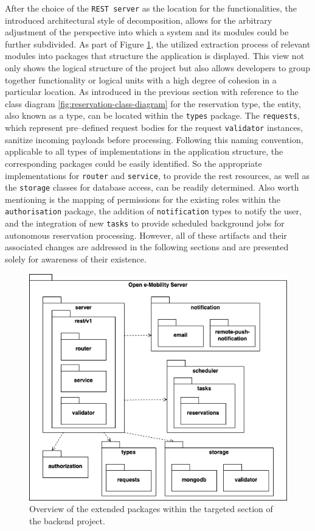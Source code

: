 After the choice of the \texttt{REST server} as the location for the functionalities, the introduced architectural style of decomposition, allows for the arbitrary adjustment of the perspective into which a system and its modules could be further subdivided.
As part of Figure \ref{fig:package-view}, the utilized extraction process of relevant modules into packages that structure the application is displayed. This view not only shows the logical structure of the project but also allows developers to group together functionality or logical units with a high degree of cohesion in a particular location.
As introduced in the previous section with reference to the class diagram \ref{fig:reservation-class-diagram} for the reservation type, the entity, also known as a type, can be located within the \texttt{types} package. 
The \texttt{requests}, which represent pre--defined request bodies for the request \texttt{validator} instances, sanitize incoming payloads before processing. Following this naming convention, applicable to all types of implementations in the application structure, the corresponding packages could be easily identified.
So the appropriate implementations for \texttt{router} and \texttt{service}, to provide the \acrshort{rest} resources, as well as the \texttt{storage} classes for database access, can be readily determined. 
Also worth mentioning is the mapping of permissions for the existing roles within the \texttt{authorisation} package, the addition of \texttt{notification} types to notify the user, and the integration of new \texttt{tasks} to provide scheduled background jobs for autonomous reservation processing.
However, all of these artifacts and their associated changes are addressed in the following sections and are presented solely for awareness of their existence.

\begin{figure}[h]
    \centering
    \includegraphics[scale=0.4]{resources/images/main/6_implementation/PackageDiagram.png}
    \caption{Overview of the extended packages within the targeted section of the backend project.}
    \label{fig:package-view}
\end{figure}

